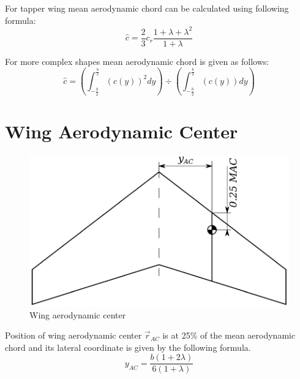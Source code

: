 For tapper wing mean aerodynamic chord can be calculated using following formula: \cite{Corke2003, Galinski2016}
\begin{equation}
  \hat c = \frac{2}{3} c_r \frac{1+\lambda+\lambda^2}{1+\lambda}
\end{equation}

For more complex shapes mean aerodynamic chord is given as follows: \cite{Paturski02}
\begin{equation}
  \hat c = 
  \left(
    \int_{-\frac{b}{2}}^{\frac{b}{2}} \left( c \left( y \right) \right)^2 dy
  \right)
  \div
  \left(
    \int_{-\frac{b}{2}}^{\frac{b}{2}} \left( c \left( y \right) \right) dy
  \right)
\end{equation}

\section{Wing Aerodynamic Center}

\begin{figure}
  \centering
  \includegraphics[width=120mm]{images/wing_aerodynamic_center.eps}
  \caption{Wing aerodynamic center}
\end{figure}

Position of wing aerodynamic center ${\vec r}_{AC}$ is at 25\% of the mean aerodynamic chord and its lateral coordinate is given by the following formula. \cite{Raymer1992, Corke2003, Galinski2016, Torenbeek1982}
\begin{equation}
  y_{AC} =
  \frac{ b \left( 1 + 2 \lambda \right) }{ 6 \left( 1 + \lambda \right) }
\end{equation}
